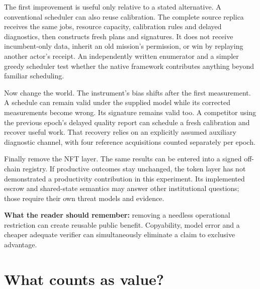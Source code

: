 The first improvement is useful only relative to a stated alternative. A conventional scheduler can also reuse calibration. The complete source replica receives the same jobs, resource capacity, calibration rules and delayed diagnostics, then constructs fresh plans and signatures. It does not receive incumbent-only data, inherit an old mission's permission, or win by replaying another actor's receipt. An independently written enumerator and a simpler greedy scheduler test whether the native framework contributes anything beyond familiar scheduling.

Now change the world. The instrument's bias shifts after the first measurement. A schedule can remain valid under the supplied model while its corrected measurements become wrong. Its signature remains valid too. A competitor using the previous epoch's delayed quality report can schedule a fresh calibration and recover useful work. That recovery relies on an explicitly assumed auxiliary diagnostic channel, with four reference acquisitions counted separately per epoch.

Finally remove the NFT layer. The same results can be entered into a signed off-chain registry. If productive outcomes stay unchanged, the token layer has not demonstrated a productivity contribution in this experiment. Its implemented escrow and shared-state semantics may answer other institutional questions; those require their own threat models and evidence.

\textbf{What the reader should remember:} removing a needless operational restriction can create reusable public benefit. Copyability, model error and a cheaper adequate verifier can simultaneously eliminate a claim to exclusive advantage.

\section{What counts as value?}
